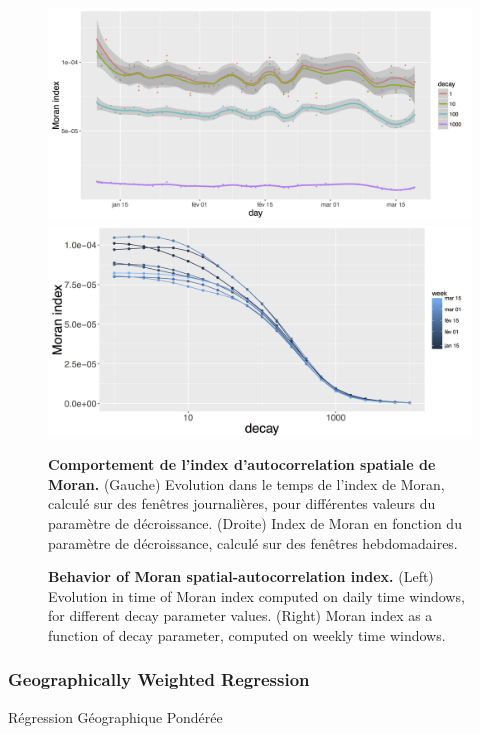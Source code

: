 \begin{figure}
\centering
\includegraphics[width=\textwidth]{Figures/EnergyPrice/moran_days}\\
\includegraphics[width=\textwidth]{Figures/EnergyPrice/moran_decay_weeks}
\caption{\textbf{Behavior of Moran spatial-autocorrelation index.} (Left) Evolution in time of Moran index computed on daily time windows, for different decay parameter values. (Right) Moran index as a function of decay parameter, computed on weekly time windows.}{\textbf{Comportement de l'index d'autocorrelation spatiale de Moran.} (Gauche) Evolution dans le temps de l'index de Moran, calculé sur des fenêtres journalières, pour différentes valeurs du paramètre de décroissance. (Droite) Index de Moran en fonction du paramètre de décroissance, calculé sur des fenêtres hebdomadaires.}
\label{fig:moran}
\end{figure}

\subsubsection{Geographically Weighted Regression}{Régression Géographique Pondérée}


